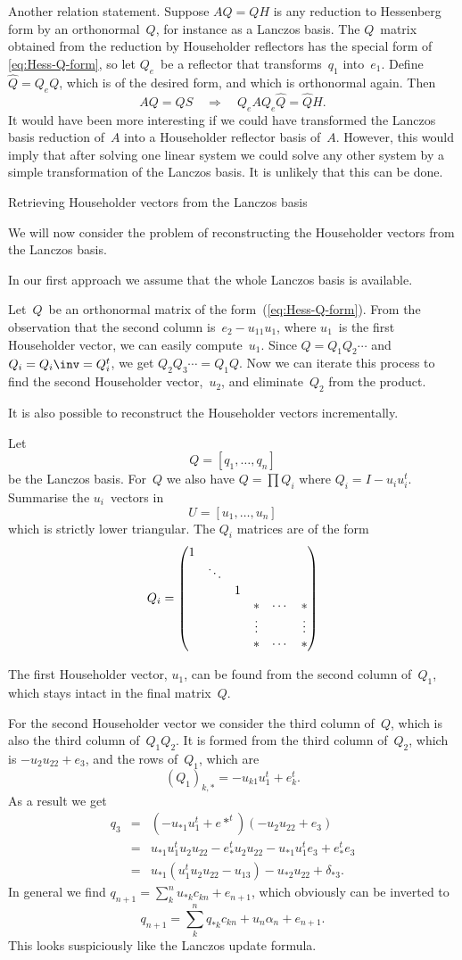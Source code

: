 \documentclass[11pt]{artikel3}
\begin{document}
\begin{Outline}
Another relation statement. Suppose $AQ=QH$ is any reduction
to Hessenberg form by an orthonormal~$Q$, for instance as a Lanczos basis.
The $Q$~matrix obtained from the reduction by Householder reflectors
has the special form of \eqref{eq:Hess-Q-form}, so let $Q_e$~be a reflector
that transforms~$q_1$ into~$e_1$.
Define $\hat Q=Q_eQ$, which is of the desired form,
and which is orthonormal again.
Then \[ AQ=QS\quad\Rightarrow\quad Q_eAQ_e\hat Q=\hat QH. \]
It would have been more interesting if
we could have transformed the Lanczos basis reduction of~$A$ into
a Householder reflector basis of~$A$. However, this would imply
that after solving one linear system we could solve any other system
by a simple transformation of the Lanczos basis.
It is unlikely that this can be done.

 {Retrieving Householder vectors from the Lanczos basis}

We will now consider the problem of reconstructing the Householder
vectors from the Lanczos basis.

In our first approach we assume that the whole Lanczos basis
is available.

Let~$Q$~be an orthonormal matrix of the form~(\ref{eq:Hess-Q-form}).
From the observation that the second column is~$e_2-u_{11}u_1$,
where $u_1$~is the first Householder vector, we can easily
compute~$u_1$.
Since $Q=Q_1Q_2\cdots$ and $Q_i=Q_i\inv=Q_i^t$, we get $Q_2Q_3\cdots=Q_1Q$.
Now we can iterate this process to find the second Householder
vector,~$u_2$, and eliminate~$Q_2$ from the product.

It is also possible to reconstruct the Householder vectors incrementally.

Let \[ Q=[q_1,\ldots,q_n] \] be the Lanczos basis.
For~$Q$ we also have $Q=\prod Q_i$ where $Q_i=I-u_iu_i^t$.
Summarise the $u_i$~vectors in \[ U=[u_1,\ldots,u_n] \]
which is strictly lower triangular.
The $Q_i$ matrices are of the form
\[ Q_i=\begin{pmatrix}1\cr &\ddots\cr &&1\cr
     &&&*&\cdots&*\cr &&&\vdots&&\vdots\cr &&&*&\cdots&*\cr\end{pmatrix} \]

The first Householder vector, $u_1$, can be found from the second
column of~$Q_1$, which stays intact in the final matrix~$Q$.

For the second Householder vector we consider the third column of~$Q$,
which is also the third column of~$Q_1Q_2$. It is formed from the
third column of~$Q_2$, which is $-u_2u_{22}+e_3$, and the 
rows of~$Q_1$, which are
\[ (Q_1)_{k,*}=-u_{k1}u_1^t+e_k^t. \]
As a result we get
\begin{eqnarray*} q_3&=&(-u_{*1}u_1^t+e*^t)(-u_2u_{22}+e_3)\\
    &=&u_{*1}u_1^tu_2u_{22}-e_*^tu_2u_{22}-u_{*1}u_1^te_3+e_*^te_3\\
    &=&u_{*1}(u_1^tu_2u_{22}-u_{13})-u_{*2}u_{22}+\delta_{*3}.
\end{eqnarray*}
In general we find $q_{n+1}=\sum_k^nu_{*k}c_{kn}+e_{n+1}$,
which obviously can be inverted to
\[ q_{n+1}=\sum_k^nq_{*k}c_{kn}+u_n\alpha_n+e_{n+1}. \]
This looks suspiciously like the Lanczos update formula.


\end{Outline}
\end{document}
